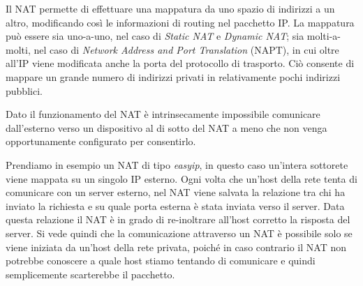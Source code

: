 Il NAT \cite{RFC_1631} permette di effettuare una mappatura da uno spazio di indirizzi a un altro, modificando così le informazioni di routing nel pacchetto IP. La mappatura può essere sia \mbox{uno-a-uno}, nel caso di \textit{Static NAT} e \textit{Dynamic NAT}; sia molti-a-molti, nel caso di \textit{Network Address and Port Translation} (NAPT), in cui oltre all'IP viene modificata anche la porta del protocollo di trasporto. Ciò consente di mappare un grande numero di indirizzi privati in relativamente pochi indirizzi pubblici. 

Dato il funzionamento del NAT è intrinsecamente impossibile comunicare dall'esterno verso un dispositivo al di sotto del NAT a meno che non venga opportunamente configurato per consentirlo.


Prendiamo in esempio un NAT di tipo \textit{easyip}, in questo caso un'intera sottorete viene mappata su un singolo IP esterno. Ogni volta che un'host della rete tenta di comunicare con un server esterno, nel NAT viene salvata la relazione tra chi ha inviato la richiesta e su quale porta esterna è stata inviata verso il server. Data questa relazione il NAT è in grado di re-inoltrare all'host corretto la risposta del server. Si vede quindi che la comunicazione attraverso un NAT è possibile solo se viene iniziata da un'host della rete privata, poiché in caso contrario il NAT non potrebbe conoscere a quale host stiamo tentando di comunicare e quindi semplicemente scarterebbe il pacchetto.


